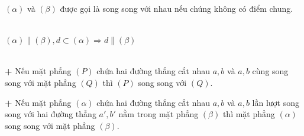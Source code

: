 \documentclass[12pt]{article}
\begin{document}
\noindent\textbf{\color{myblue}{a/ Hai mặt phẳng song song:}} $(\alpha)$ và $(\beta)$ được gọi là song song với nhau nếu chúng không có điểm chung.

\begin{notebox}
\noindent\textbf{}\\
\indent $(\alpha) \parallel (\beta), d \subset (\alpha) \Rightarrow d \parallel (\beta)$
\end{notebox}

\vspace{0.2cm}

\noindent\textbf{\color{myblue}{b/ Điều kiện để hai mặt phẳng song song}}\\
\textbf{+} Nếu mặt phẳng $(P)$ chứa hai đường thẳng cắt nhau $a, b$ và $a, b$ cùng song song với mặt phẳng $(Q)$ thì $(P)$ song song với $(Q)$.

\vspace{0.2cm}
\begin{center}
\end{center}

\noindent\textbf{+} Nếu mặt phẳng $(\alpha)$ chứa hai đường thẳng cắt nhau $a, b$ và $a, b$ lần lượt song song với hai đường thẳng $a', b'$ nằm trong mặt phẳng $(\beta)$ thì mặt phẳng $(\alpha)$ song song với mặt phẳng $(\beta)$.
\end{document}
